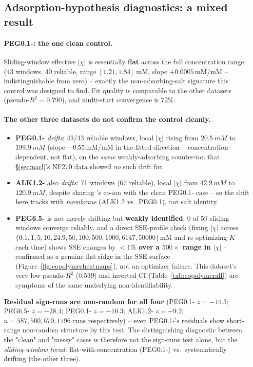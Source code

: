 \documentclass[11pt]{article}
\begin{document}
\subsection{Adsorption-hypothesis diagnostics: a mixed result}\label{sec:copolymerdiag}
\paragraph{PEG0.1-: the one clean control.} Sliding-window
effective $|\chi|$ is essentially \textbf{flat} across the full concentration
range (43 windows, 40 reliable, range $[1.21,1.84]$\,mM, slope
$+0.0005$\,mM/mM -- indistinguishable from zero) -- exactly the
non-adsorbing-salt signature this control was designed to find. Fit quality
is comparable to the other datasets (pseudo-$R^2=0.790$), and multi-start
convergence is $72\%$.

\paragraph{The other three datasets do not confirm the control cleanly.}
\begin{itemize}
  \item \textbf{PEG0.1-} \emph{drifts}: 43/43 reliable windows,
  local $|\chi|$ rising from $\SI{20.5}{mM}$ to $\SI{199.9}{mM}$
  (slope $-0.55$\,mM/mM in the fitted direction -- concentration-dependent,
  not flat), on the \emph{same} weakly-adsorbing  counter-ion that
  \S\ref{sec:nacl}'s NF270  data showed \emph{no} such drift for.
  \item \textbf{ALK1.2-} also \emph{drifts}: 71 windows (67
  reliable), local $|\chi|$ from $\SI{42.9}{mM}$ to $\SI{120.9}{mM}$,
  despite sharing 's co-ion with the clean PEG0.1-
  case -- so the drift here tracks with \emph{membrane} (ALK1.2 vs.\ PEG0.1),
  not salt identity.
  \item \textbf{PEG6.5-} is not merely drifting but \textbf{weakly
  identified}: 0 of 59 sliding windows converge reliably, and a direct
  SSE-profile check (fixing $|\chi|$ across
  $\{0.1,1,5,10,24.9,50,100,500,1000,6147,50000\}$\,mM and re-optimizing $K$
  each time) shows SSE changes by \textbf{$<1\%$ over a $500\times$ range in
  $|\chi|$} -- confirmed as a genuine flat ridge in the SSE surface
  (Figure~\ref{fig:copolymerheatmaps}), not an optimizer failure. This
  dataset's very low pseudo-$R^2$ ($0.539$) and inverted CI
  (Table~\ref{tab:copolymerall}) are symptoms of the same underlying
  non-identifiability.
\end{itemize}
\textbf{Residual sign-runs are non-random for all four} (PEG0.1-
$z=-14.3$; PEG6.5- $z=-28.4$; PEG0.1- $z=-10.3$;
ALK1.2- $z=-9.2$; $n=587,500,670,1196$ runs respectively) -- even
PEG0.1-'s residuals show short-range non-random structure by this
test. The distinguishing diagnostic between the "clean" and "messy" cases is
therefore not the sign-runs test alone, but the \emph{sliding-window trend}:
flat-with-concentration (PEG0.1-) vs.\ systematically drifting
(the other three).
\end{document}
